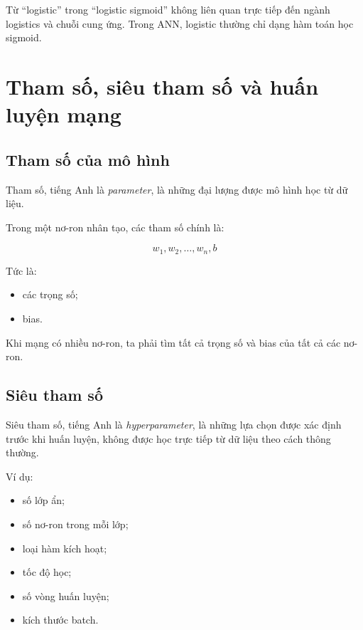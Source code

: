 \documentclass[12pt,a4paper]{report}
\begin{document}
\begin{canhbao}
Từ ``logistic'' trong ``logistic sigmoid'' không liên quan trực tiếp đến ngành logistics và chuỗi cung ứng. Trong ANN, logistic thường chỉ dạng hàm toán học sigmoid.
\end{canhbao}

\chapter{Tham số, siêu tham số và huấn luyện mạng}

\section{Tham số của mô hình}

Tham số, tiếng Anh là \textit{parameter}, là những đại lượng được mô hình học từ dữ liệu.

Trong một nơ-ron nhân tạo, các tham số chính là:

\[
    w_1, w_2, \ldots, w_n, b
\]

Tức là:

\begin{itemize}
    \item các trọng số;
    \item bias.
\end{itemize}

Khi mạng có nhiều nơ-ron, ta phải tìm tất cả trọng số và bias của tất cả các nơ-ron.

\section{Siêu tham số}

Siêu tham số, tiếng Anh là \textit{hyperparameter}, là những lựa chọn được xác định trước khi huấn luyện, không được học trực tiếp từ dữ liệu theo cách thông thường.

Ví dụ:

\begin{itemize}
    \item số lớp ẩn;
    \item số nơ-ron trong mỗi lớp;
    \item loại hàm kích hoạt;
    \item tốc độ học;
    \item số vòng huấn luyện;
    \item kích thước batch.
\end{itemize}
\end{document}
